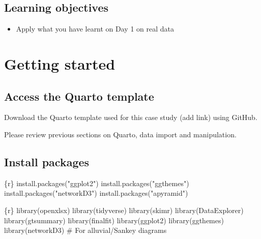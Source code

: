 \documentclass[
  letterpaper,
  DIV=11,
  numbers=noendperiod,
  oneside]{scrreprt}
\newenvironment{Shaded}{\begin{snugshade}}{\end{snugshade}}
\newcommand{\CommentTok}[1]{\textcolor[rgb]{0.37,0.37,0.37}{#1}}
\newcommand{\FunctionTok}[1]{\textcolor[rgb]{0.28,0.35,0.67}{#1}}
\newcommand{\InformationTok}[1]{\textcolor[rgb]{0.37,0.37,0.37}{#1}}
\newcommand{\NormalTok}[1]{\textcolor[rgb]{0.00,0.23,0.31}{#1}}
\newcommand{\StringTok}[1]{\textcolor[rgb]{0.13,0.47,0.30}{#1}}
\providecommand{\tightlist}{%
  \setlength{\itemsep}{0pt}\setlength{\parskip}{0pt}}\usepackage{longtable,booktabs,array}
\begin{document}
\hypertarget{learning-objectives-8}{%
\subsection{Learning objectives}\label{learning-objectives-8}}

\begin{itemize}
\tightlist
\item
  Apply what you have learnt on Day 1 on real data
\end{itemize}

\hypertarget{getting-started-1}{%
\section{Getting started}\label{getting-started-1}}

\hypertarget{access-the-quarto-template-1}{%
\subsection{Access the Quarto
template}\label{access-the-quarto-template-1}}

Download the Quarto template used for this case study (add link) using
GitHub.

Please review previous sections on Quarto, data import and manipulation.

\hypertarget{install-packages-1}{%
\subsection{Install packages}\label{install-packages-1}}

\begin{Shaded}
\begin{Highlighting}[]
\InformationTok{\textasciigrave{}\textasciigrave{}\textasciigrave{}\{r\}}
\FunctionTok{install.packages}\NormalTok{(}\StringTok{"ggplot2"}\NormalTok{)}
\FunctionTok{install.packages}\NormalTok{(}\StringTok{"ggthemes"}\NormalTok{)}
\FunctionTok{install.packages}\NormalTok{(}\StringTok{"networkD3"}\NormalTok{)}
\FunctionTok{install.packages}\NormalTok{(}\StringTok{"apyramid"}\NormalTok{)}
\InformationTok{\textasciigrave{}\textasciigrave{}\textasciigrave{}}
\end{Highlighting}
\end{Shaded}

\begin{Shaded}
\begin{Highlighting}[]
\InformationTok{\textasciigrave{}\textasciigrave{}\textasciigrave{}\{r\}}
\FunctionTok{library}\NormalTok{(openxlsx)}
\FunctionTok{library}\NormalTok{(tidyverse)}
\FunctionTok{library}\NormalTok{(skimr)}
\FunctionTok{library}\NormalTok{(DataExplorer)}
\FunctionTok{library}\NormalTok{(gtsummary)}
\FunctionTok{library}\NormalTok{(finalfit)}
\FunctionTok{library}\NormalTok{(ggplot2)}
\FunctionTok{library}\NormalTok{(ggthemes)}
\FunctionTok{library}\NormalTok{(networkD3) }\CommentTok{\# For alluvial/Sankey diagrams}
\InformationTok{\textasciigrave{}\textasciigrave{}\textasciigrave{}}
\end{Highlighting}
\end{Shaded}
\end{document}
